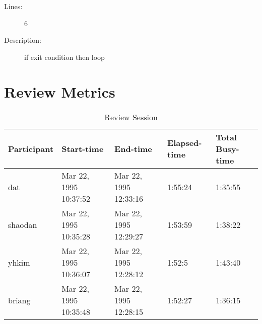\begin{enumerate}
\begin{description}
\item [Lines:] 6

\item [Description:] if exit condition then loop
\end{description}
\end{enumerate}
\section{Review Metrics}
\begin{table}[hb]
\begin{center}
\begin{tabular}{|l|l|l|l|l|}
\hline
Participant & Start-time & End-time & Elapsed-time & Total Busy-time \\
\hline
dat & Mar 22, 1995 10:37:52 & Mar 22, 1995 12:33:16 & 1:55:24 & 1:35:55 \\
shaodan & Mar 22, 1995 10:35:28 & Mar 22, 1995 12:29:27 & 1:53:59 & 1:38:22 \\
yhkim & Mar 22, 1995 10:36:07 & Mar 22, 1995 12:28:12 & 1:52:5 & 1:43:40 \\
briang & Mar 22, 1995 10:35:48 & Mar 22, 1995 12:28:15 & 1:52:27 & 1:36:15 \\
\hline
\end{tabular}
\end{center}
\caption{Review Session}
\end{table}


